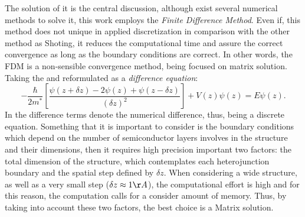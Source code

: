 The solution of  it is the central discussion, although exist several numerical methods to solve it, this work employs the \emph{Finite Difference Method}.
Even if, this method does not unique in applied discretization in comparison with the other method as Shoting\cite{killingbeck2020microcomputer,harrison2016quantum}, it reduces the computational time and assure the correct convergence as long as the boundary conditions are correct. In other words, the \gls{FDM} is a non-sensible convergence method, being focused on matrix solution.  Taking the  and reformulated as a \emph{difference equation}\cite{harrison2016quantum}:
\begin{equation}\label{eqn:chapter-2-sec-numerical-calculations-schrodinger-discrete}
	-\dfrac{\hbar}{2m^{*}}\left[\dfrac{\psi(z+\delta z)-2\psi(z)+\psi(z-\delta z)}{(\delta z)^2}\right] + V(z)\psi(z)=E\psi(z).
\end{equation}
In  the difference terms denote the numerical difference, thus,  being a discrete equation. Something that it is important to consider is the boundary conditions which depend on the number of semiconductor layers involves in the structure and their dimensions, then it requires high precision important two factors: the total dimension of the structure, which contemplates each heterojunction boundary and the spatial step defined by $\delta z$. When considering a wide structure, as well as a very small step ($\delta z \approx 1\AA$), the computational effort is high and for this reason, the computation calls for a consider amount of memory. Thus, by taking into account these two factors, the best choice is a Matrix solution.

